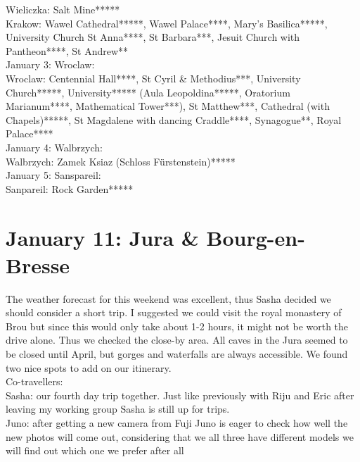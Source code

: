 Wieliczka: Salt Mine*****\\
Krakow: Wawel Cathedral*****, Wawel Palace****, Mary's Basilica*****, University Church St Anna****, St Barbara***, Jesuit Church with Pantheon****, St Andrew**\\

January 3: Wroclaw:\\

Wroclaw: Centennial Hall****, St Cyril \& Methodius***, University Church*****, University***** (Aula Leopoldina*****, Oratorium Marianum****, Mathematical Tower***), St Matthew***, Cathedral (with Chapels)*****, St Magdalene with dancing Craddle****, Synagogue**, Royal Palace****\\

January 4: Walbrzych:\\

Walbrzych: Zamek Ksiaz (Schloss F\"urstenstein)*****\\

January 5: Sanspareil:\\

Sanpareil: Rock Garden*****\\

\section{January 11: Jura \& Bourg-en-Bresse}
\label{2020:BourgEnBresse}

The weather forecast for this weekend was excellent, thus Sasha decided we should consider a short trip. I suggested we could visit the royal monastery of Brou but since this would only take about 1-2 hours, it might not be worth the drive alone. Thus we checked the close-by area. All caves in the Jura seemed to be closed until April, but gorges and waterfalls are always accessible. We found two nice spots to add on our itinerary.\\

Co-travellers:\\
Sasha: our fourth day trip together. Just like previously with Riju and Eric after leaving my working group Sasha is still up for trips. \\
Juno: after getting a new camera from Fuji Juno is eager to check how well the new photos will come out, considering that we all three have different models we will find out which one we prefer after all\\

